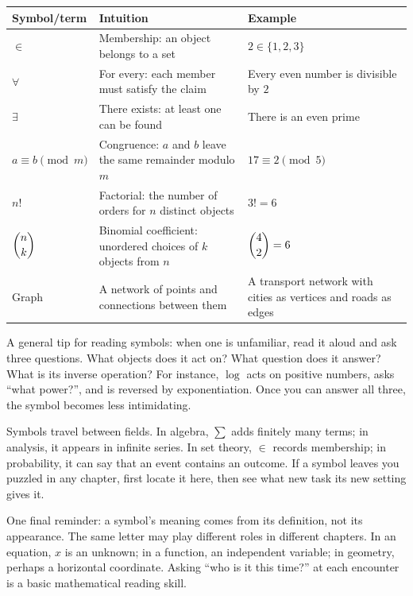 \begin{center}
\begin{tabular}{lp{4.8cm}p{5.4cm}}
\toprule
Symbol/term & Intuition & Example \\
\midrule
$\in$ & Membership: an object belongs to a set & $2\in\{1,2,3\}$ \\
$\forall$ & For every: each member must satisfy the claim & Every even number is divisible by $2$ \\
$\exists$ & There exists: at least one can be found & There is an even prime \\
$a\equiv b\pmod{m}$ & Congruence: $a$ and $b$ leave the same remainder modulo $m$ & $17\equiv 2\pmod{5}$ \\
$n!$ & Factorial: the number of orders for $n$ distinct objects & $3!=6$ \\
$\dbinom{n}{k}$ & Binomial coefficient: unordered choices of $k$ objects from $n$ & $\dbinom{4}{2}=6$ \\
Graph & A network of points and connections between them & A transport network with cities as vertices and roads as edges \\
\bottomrule
\end{tabular}
\end{center}

A general tip for reading symbols: when one is unfamiliar, read it aloud and ask three questions. What objects does it act on? What question does it answer? What is its inverse operation? For instance, $\log$ acts on positive numbers, asks ``what power?'', and is reversed by exponentiation. Once you can answer all three, the symbol becomes less intimidating.

\begin{lianjie}
Symbols travel between fields. In algebra, $\sum$ adds finitely many terms; in analysis, it appears in infinite series. In set theory, $\in$ records membership; in probability, it can say that an event contains an outcome. If a symbol leaves you puzzled in any chapter, first locate it here, then see what new task its new setting gives it.
\end{lianjie}

One final reminder: a symbol's meaning comes from its definition, not its appearance. The same letter may play different roles in different chapters. In an equation, $x$ is an unknown; in a function, an independent variable; in geometry, perhaps a horizontal coordinate. Asking ``who is it this time?'' at each encounter is a basic mathematical reading skill.
